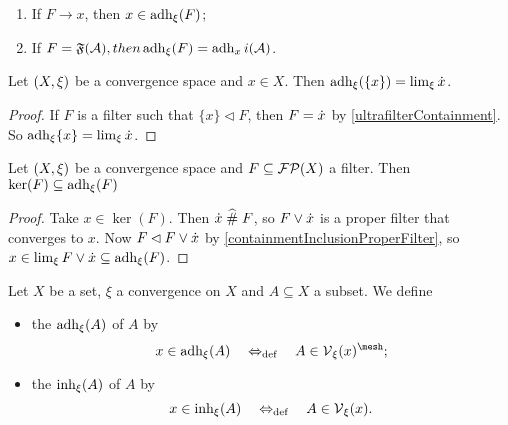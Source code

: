 \begin{lemma}
\begin{enumerate}
\item If $F\to x$, then $x\in \operatorname{adh}_\xi(F)$;
\item If $F = \mathfrak{F}(\mathcal{A}), then \operatorname{adh}_\xi(F) = \operatorname{adh}_xi(\mathcal{A})$.
\end{enumerate}
\end{lemma}

\begin{lemma} \label{singletonAdherence}
Let $\left( X,\xi \right)$ be a convergence space and $x\in X$. Then $\operatorname{adh}_\xi(\{x\}) = \lim_\xi \dot{x}$.
\end{lemma}
\begin{proof}
If $F$ is a filter such that $\{x\} \lhd F$, then $F = \dot{x}$ by \ref{ultrafilterContainment}. So $\operatorname{adh}_\xi \{x\} = \lim_\xi \dot{x}$.
\end{proof}

\begin{proposition}
Let $\left( X,\xi \right)$ be a convergence space and $F\subseteq \operatorname{\mathcal{FP}}(X)$ a filter. Then $\ker(F) \subseteq \operatorname{adh}_\xi(F)$
\end{proposition}
\begin{proof}
Take $x\in \ker(F)$. Then $\dot{x}\mathrel{\widehat{\#}} F$, so $F\vee \dot{x}$ is a proper filter that converges to $x$. Now $F\lhd F\vee \dot{x}$ by \ref{containmentInclusionProperFilter}, so $x\in \lim_\xi F\vee \dot{x} \subseteq \operatorname{adh}_\xi(F)$.
\end{proof}

\begin{definition}
Let $X$ be a set, $\xi$ a convergence on $X$ and $A\subseteq X$ a subset. We define
\begin{itemize}
\item the  $\operatorname{adh}_\xi(A)$ of $A$ by
\[ x\in \adh_\xi(A) \defequiv A\in \vicinity_\xi(x)^{\mesh}; \]
\item the  $\operatorname{inh}_\xi(A)$ of $A$ by
\[ x\in \operatorname{inh}_\xi(A) \quad\Leftrightarrow_{\text{def}}\quad A\in \operatorname{\mathcal{V}}_\xi(x). \]
\end{itemize}
\end{definition}

